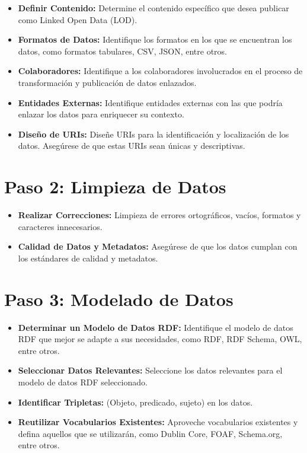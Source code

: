 \documentclass[11pt]{report}
\begin{document}
		  \begin{itemize}
			\item \textbf{Definir Contenido:} Determine el contenido específico que desea publicar como Linked Open Data (LOD).
			
			\item \textbf{Formatos de Datos:} Identifique los formatos en los que se encuentran los datos, como formatos tabulares, CSV, JSON, entre otros.
			
			\item \textbf{Colaboradores:} Identifique a los colaboradores involucrados en el proceso de transformación y publicación de datos enlazados.
			
			\item \textbf{Entidades Externas:} Identifique entidades externas con las que podría enlazar los datos para enriquecer su contexto.
			
			\item \textbf{Diseño de URIs:} Diseñe URIs para la identificación y localización de los datos. Asegúrese de que estas URIs sean únicas y descriptivas.
		\end{itemize}	
		\section{Paso 2: Limpieza de Datos}
			\begin{itemize}
			\item \textbf{Realizar Correcciones:} Limpieza de errores ortográficos, vacíos, formatos y caracteres innecesarios.
			
			\item \textbf{Calidad de Datos y Metadatos:} Asegúrese de que los datos cumplan con los estándares de calidad y metadatos.
			\end{itemize}		
		\section{Paso 3: Modelado de Datos}
		\begin{itemize}
			\item \textbf{Determinar un Modelo de Datos RDF:} Identifique el modelo de datos RDF que mejor se adapte a sus necesidades, como RDF, RDF Schema, OWL, entre otros.
			
			\item \textbf{Seleccionar Datos Relevantes:} Seleccione los datos relevantes para el modelo de datos RDF seleccionado.
			
			\item \textbf{Identificar Tripletas:} (Objeto, predicado, sujeto) en los datos.
			
			\item \textbf{Reutilizar Vocabularios Existentes:} Aproveche vocabularios existentes y defina aquellos que se utilizarán, como Dublin Core, FOAF, Schema.org, entre otros.
		\end{itemize}
		
\end{document}
